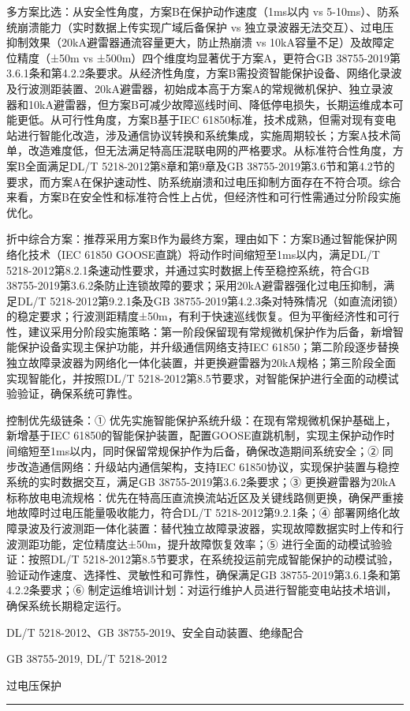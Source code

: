 \documentclass[12pt,a4paper]{ctexart}
\begin{document}
\begin{description}[leftmargin=1.5em,style=nextline,font=\normalfont]
多方案比选：从安全性角度，方案B在保护动作速度（1ms以内 vs 5-10ms）、防系统崩溃能力（实时数据上传实现广域后备保护 vs 独立录波器无法交互）、过电压抑制效果（20kA避雷器通流容量更大，防止热崩溃 vs 10kA容量不足）及故障定位精度（±50m vs ±500m）四个维度均显著优于方案A，更符合GB 38755-2019第3.6.1条和第4.2.2条要求。从经济性角度，方案B需投资智能保护设备、网络化录波及行波测距装置、20kA避雷器，初始成本高于方案A的常规微机保护、独立录波器和10kA避雷器，但方案B可减少故障巡线时间、降低停电损失，长期运维成本可能更低。从可行性角度，方案B基于IEC 61850标准，技术成熟，但需对现有变电站进行智能化改造，涉及通信协议转换和系统集成，实施周期较长；方案A技术简单，改造难度低，但无法满足特高压混联电网的严格要求。从标准符合性角度，方案B全面满足DL/T 5218-2012第8章和第9章及GB 38755-2019第3.6节和第4.2节的要求，而方案A在保护速动性、防系统崩溃和过电压抑制方面存在不符合项。综合来看，方案B在安全性和标准符合性上占优，但经济性和可行性需通过分阶段实施优化。

折中综合方案：推荐采用方案B作为最终方案，理由如下：方案B通过智能保护网络化技术（IEC 61850 GOOSE直跳）将动作时间缩短至1ms以内，满足DL/T 5218-2012第8.2.1条速动性要求，并通过实时数据上传至稳控系统，符合GB 38755-2019第3.6.2条防止连锁故障的要求；采用20kA避雷器强化过电压抑制，满足DL/T 5218-2012第9.2.1条及GB 38755-2019第4.2.3条对特殊情况（如直流闭锁）的稳定要求；行波测距精度±50m，有利于快速巡线恢复。但为平衡经济性和可行性，建议采用分阶段实施策略：第一阶段保留现有常规微机保护作为后备，新增智能保护设备实现主保护功能，并升级通信网络支持IEC 61850；第二阶段逐步替换独立故障录波器为网络化一体化装置，并更换避雷器为20kA规格；第三阶段全面实现智能化，并按照DL/T 5218-2012第8.5节要求，对智能保护进行全面的动模试验验证，确保系统可靠性。

控制优先级链条：① 优先实施智能保护系统升级：在现有常规微机保护基础上，新增基于IEC 61850的智能保护装置，配置GOOSE直跳机制，实现主保护动作时间缩短至1ms以内，同时保留常规保护作为后备，确保改造期间系统安全；② 同步改造通信网络：升级站内通信架构，支持IEC 61850协议，实现保护装置与稳控系统的实时数据交互，满足GB 38755-2019第3.6.2条要求；③ 更换避雷器为20kA标称放电电流规格：优先在特高压直流换流站近区及关键线路侧更换，确保严重接地故障时过电压能量吸收能力，符合DL/T 5218-2012第9.2.1条；④ 部署网络化故障录波及行波测距一体化装置：替代独立故障录波器，实现故障数据实时上传和行波测距功能，定位精度达±50m，提升故障恢复效率；⑤ 进行全面的动模试验验证：按照DL/T 5218-2012第8.5节要求，在系统投运前完成智能保护的动模试验，验证动作速度、选择性、灵敏性和可靠性，确保满足GB 38755-2019第3.6.1条和第4.2.2条要求；⑥ 制定运维培训计划：对运行维护人员进行智能变电站技术培训，确保系统长期稳定运行。
  \item[KW:] DL/T 5218-2012、GB 38755-2019、安全自动装置、绝缘配合
  \item[Std:] GB 38755-2019, DL/T 5218-2012
  \item[Topic:] 过电压保护
\end{description}
\vspace{4pt}
\hrule\vspace{6pt}
\end{document}
